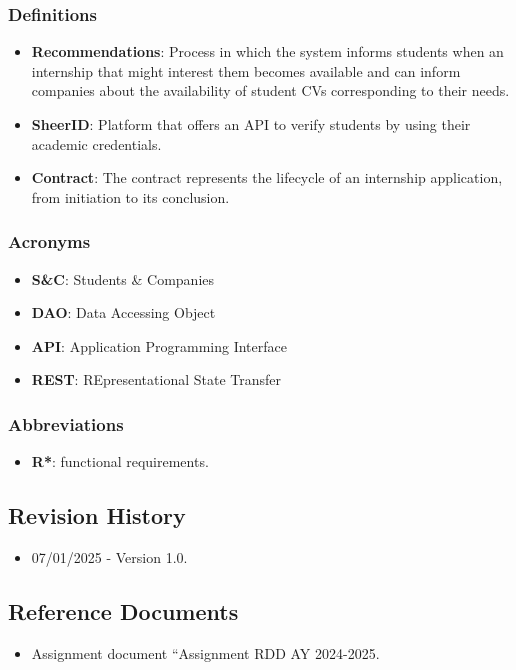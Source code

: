 \subsubsection{Definitions}
\begin{itemize}
    \item \textbf{Recommendations}: Process in which the system informs students when an internship that might interest them becomes available and can inform companies about the availability of student CVs corresponding to their needs.
    \item \textbf{SheerID}\cite{sheerid}: Platform that offers an API to verify students by using their academic credentials.
    \item \textbf{Contract}: The contract represents the lifecycle of an internship application, from initiation to its conclusion.
\end{itemize}
\subsubsection{Acronyms}
\begin{itemize}
    \item \textbf{S\&C}: Students \& Companies
    \item \textbf{DAO}: Data Accessing Object
    \item \textbf{API}: Application Programming Interface
    \item \textbf{REST}: REpresentational State Transfer
\end{itemize}
\subsubsection{Abbreviations}
\begin{itemize}
    \item \textbf{R*}: functional requirements.
\end{itemize}
\subsection{Revision History}
\begin{itemize}
    \item 07/01/2025 - Version 1.0.
\end{itemize}
\subsection{Reference Documents}
\begin{itemize}
    \item Assignment document “Assignment RDD AY 2024-2025.
\end{itemize}
